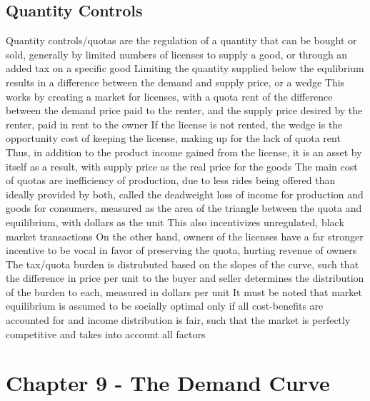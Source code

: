 \documentclass[11 pt, twoside]{article}
\newenvironment{outline*}
{
	\begin{outline}[enumerate]
	}
	{\end{outline}
}
\begin{document}
\subsection{Quantity Controls}
\begin{outline*}
\1 Quantity controls/quotas are the regulation of a quantity that can be bought or sold, generally by limited numbers of licenses to supply a good, or through an added tax on a specific good
\1 Limiting the quantity supplied below the equlibrium results in a difference between the demand and supply price, or a wedge
\2 This works by creating a market for licenses, with a quota rent of the difference between the demand price paid to the renter, and the supply price desired by the renter, paid in rent to the owner
\2 If the license is not rented, the wedge is the opportunity cost of keeping the license, making up for the lack of quota rent
\2 Thus, in addition to the product income gained from the license, it is an asset by itself as a result, with supply price as the real price for the goods
\1 The main cost of quotas are inefficiency of production, due to less rides being offered than ideally provided by both, called the deadweight loss of income for production and goods for consumers, measured as the area of the triangle between the quota and equilibrium, with dollars as the unit
\2 This also incentivizes unregulated, black market transactions
\2 On the other hand, owners of the licenses have a far stronger incentive to be vocal in favor of preserving the quota, hurting revenue of owners
\1 The tax/quota burden is distrubuted based on the slopes of the curve, such that the difference in price per unit to the buyer and seller determines the distribution of the burden to each, measured in dollars per unit
\1 It must be noted that market equilibrium is assumed to be socially optimal only if all cost-benefits are accounted for and income distribution is fair, such that the market is perfectly competitive and takes into account all factors
\end{outline*}

\section{Chapter 9 - The Demand Curve}
\end{document}
